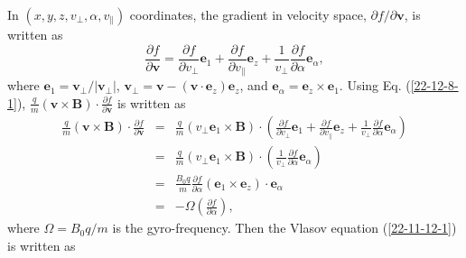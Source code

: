 \documentclass{article}
\begin{document}
In $(x, y, z, v_{\perp}, \alpha, v_{\parallel})$ coordinates, the gradient in
velocity space, $\partial f / \partial \mathbf{v}$, is written as
\begin{equation}
  \label{22-12-8-1} \frac{\partial f}{\partial \mathbf{v}} = \frac{\partial
  f}{\partial v_{\perp}} \mathbf{e}_1 + \frac{\partial f}{\partial
  v_{\parallel}} \mathbf{e}_z + \frac{1}{v_{\perp}} \frac{\partial f}{\partial
  \alpha} \mathbf{e}_{\alpha},
\end{equation}
where $\mathbf{e}_1 =\mathbf{v}_{\perp} / | \mathbf{v}_{\perp} |$,
$\mathbf{v}_{\perp} =\mathbf{v}- (\mathbf{v} \cdot \mathbf{e}_z)
\mathbf{e}_z$, and $\mathbf{e}_{\alpha} =\mathbf{e}_z \times \mathbf{e}_1$.
Using Eq. (\ref{22-12-8-1}), $\frac{q}{m} (\mathbf{v} \times \mathbf{B}) \cdot
\frac{\partial f}{\partial \mathbf{v}}$ is written as
\begin{eqnarray}
  \frac{q}{m} (\mathbf{v} \times \mathbf{B}) \cdot \frac{\partial f}{\partial
  \mathbf{v}} & = & \frac{q}{m} (v_{\perp} \mathbf{e}_1 \times \mathbf{B})
  \cdot \left( \frac{\partial f}{\partial v_{\perp}} \mathbf{e}_1 +
  \frac{\partial f}{\partial v_{\parallel}} \mathbf{e}_z + \frac{1}{v_{\perp}}
  \frac{\partial f}{\partial \alpha} \mathbf{e}_{\alpha} \right) \nonumber\\
  & = & \frac{q}{m} (v_{\perp} \mathbf{e}_1 \times \mathbf{B}) \cdot \left(
  \frac{1}{v_{\perp}} \frac{\partial f}{\partial \alpha} \mathbf{e}_{\alpha}
  \right) \nonumber\\
  & = & \frac{B_0 q}{m}  \frac{\partial f}{\partial \alpha}  (\mathbf{e}_1
  \times \mathbf{e}_z) \cdot \mathbf{e}_{\alpha} \nonumber\\
  & = & - \Omega \left( \frac{\partial f}{\partial \alpha} \right), 
\end{eqnarray}
where $\Omega = B_0 q / m$ is the gyro-frequency. Then the Vlasov equation
(\ref{22-11-12-1}) is written as
\end{document}
